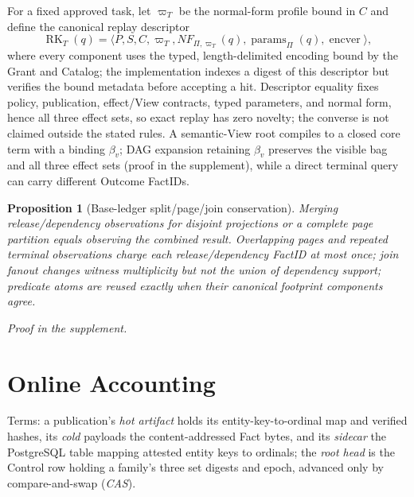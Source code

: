 \documentclass[10pt,journal,compsoc]{IEEEtran}
\newtheorem{proposition}{Proposition}
\begin{document}
For a fixed approved task, let $\varpi_T$ be the normal-form profile bound in
$C$ and define the canonical replay descriptor
\begin{equation}
 \operatorname{RK}_T(q)=\langle P,S,C,\varpi_T,NF_{\Pi,\varpi_T}(q),
     \operatorname{params}_\Pi(q),\operatorname{encver}\rangle,
 \label{eq:replay-descriptor}
\end{equation}
where every component uses the typed, length-delimited encoding bound by the
Grant and Catalog; the implementation indexes a digest of this descriptor but
verifies the bound metadata before accepting a hit. Descriptor equality fixes
policy, publication, effect/View contracts, typed parameters, and normal form,
hence all three effect sets, so exact replay has zero novelty; the converse is
not claimed outside the stated rules. A semantic-View root compiles to a
closed core term with a binding $\beta_v$; DAG expansion retaining
$\beta_v$ preserves the visible bag and all three effect sets (proof in the
supplement), while a direct terminal query can carry different Outcome
FactIDs.

\begin{proposition}[Base-ledger split/page/join conservation]
\label{thm:base-conservation}
Merging release/dependency observations for disjoint projections or a complete
page partition equals observing the combined result. Overlapping pages and
repeated terminal observations charge each release/dependency FactID at most
once; join fanout changes witness multiplicity but not the union of dependency
support; predicate atoms are reused exactly when their canonical footprint
components agree.
\end{proposition}
\emph{Proof in the supplement.}

\section{Online Accounting}
\label{sec:online}

Terms: a publication's \emph{hot artifact} holds its entity-key-to-ordinal
map and verified hashes, its \emph{cold} payloads the content-addressed Fact
bytes, and its \emph{sidecar} the PostgreSQL table mapping attested entity
keys to ordinals; the \emph{root head} is the Control row holding a family's
three set digests and epoch, advanced only by compare-and-swap (\emph{CAS}).
\end{document}
